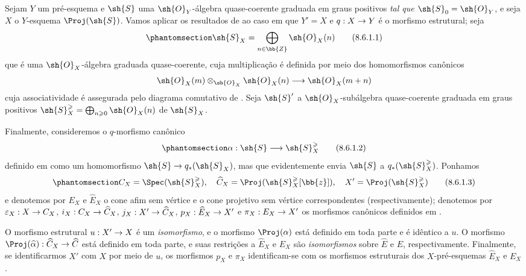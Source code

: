 \documentclass[oneside,10pt]{amsart}
\makeatletter
\renewcommand{\geq}{\geqslant}
\newcommand{\ega@arrow}[2]{\mathchoice{#1}{#2}{#2}{#2}}
\renewcommand{\to}{\ega@arrow{\longrightarrow}{\rightarrow}}
\newcommand{\oldpage}[2][]{\marginnote{\normalfont\footnotesize\textbf{#1}~|~#2}\ignorespaces}
\let\EGAOriginalLabel\label
\renewcommand{\label}[1]{\phantomsection\EGAOriginalLabel{#1}}
\makeatother
\begin{document}
\begin{env}[8.6.1]
\label{II.8.6.1}
Sejam $Y$ um pré-esquema e $\sh{S}$ uma $\sh{O}_Y$-álgebra quase-coerente graduada em graus positivos \emph{tal que $\sh{S}_0=\sh{O}_Y$}, e seja $X$ o $Y$-esquema $\Proj(\sh{S})$.
Vamos aplicar os resultados de  ao caso em que $Y'=X$ e $q:X\to Y$ é o morfismo estrutural;
seja
\[
\label{II.8.6.1.1}
  \sh{S}_X=\bigoplus_{n\in\bb{Z}}\sh{O}_X(n)
  \tag{8.6.1.1}
\]
\oldpage[II]{172}
que é uma $\sh{O}_X$-álgebra graduada quase-coerente, cuja multiplicação é definida por meio dos homomorfismos canônicos 
\[
  \sh{O}_X(m)\otimes_{\sh{O}_X}\sh{O}_X(n)\to\sh{O}_X(m+n)
\]
cuja associatividade é assegurada pelo diagrama comutativo de .
Seja $\sh{S}'$ a $\sh{O}_X$-subálgebra quase-coerente graduada em graus positivos $\sh{S}_X^\geq=\bigoplus_{n\geq0}\sh{O}_X(n)$ de $\sh{S}_X$.

Finalmente, consideremos o $q$-morfismo canônico
\[
\label{II.8.6.1.2}
  \alpha: \sh{S} \to \sh{S}_X^\geq
\tag{8.6.1.2}
\]
definido em  como um homomorfismo $\sh{S}\to q_*(\sh{S}_X)$, mas que evidentemente envia $\sh{S}$ a $q_*(\sh{S}_X^\geq)$.
Ponhamos
\[
\label{II.8.6.1.3}
  C_X = \Spec(\sh{S}_X^\geq),
  \quad
  \widehat{C}_X = \Proj(\sh{S}_X^\geq[\bb{z}]),
  \quad
  X' = \Proj(\sh{S}_X^\geq)
\tag{8.6.1.3}
\]
e denotemos por $E_X$ e $\widehat{E}_X$ o cone afim sem vértice e o cone projetivo sem vértice correspondentes (respectivamente);
denotemos por $\varepsilon_X:X\to C_X$, $i_X:C_X\to\widehat{C}_X$, $j_X:X'\to\widehat{C}_X$, $p_X:\widehat{E}_X\to X'$ e $\pi_X:E_X\to X'$ os morfismos canônicos definidos em .
\end{env}
\begin{proposition}[8.6.2]
\label{II.8.6.2}
O morfismo estrutural $u:X'\to X$ é um \emph{isomorfismo}, e o morfismo $\Proj(\alpha)$ está definido em toda parte e é idêntico a $u$.
O morfismo $\Proj(\widehat{\alpha}):\widehat{C}_X\to\widehat{C}$ está definido em toda parte, e suas restrições a $\widehat{E}_X$ e $E_X$ são \emph{isomorfismos} sobre $\widehat{E}$ e $E$, respectivamente.
Finalmente, se identificarmos $X'$ com $X$ por meio de $u$, os morfismos $p_X$ e $\pi_X$ identificam-se com os morfismos estruturais dos $X$-pré-esquemas $\widehat{E}_X$ e $E_X$.
\end{proposition}
\end{document}

